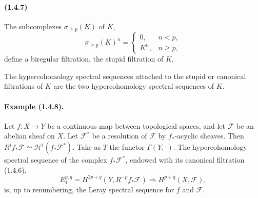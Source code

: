 \documentclass[10pt]{article}
\newcommand{\calH}{\mathcal H}
\newcommand{\calF}{\mathcal F}
\begin{document}
\paragraph{(1.4.7)} The subcomplexes $\sigma_{\ge p}(K)$ of $K$,
\[
\sigma_{\ge p}(K)^n=\begin{cases}
0,& n<p,\\
K^n,& n\ge p,
\end{cases}
\]
define a biregular filtration, the stupid filtration of $K$.

The hypercohomology spectral sequences attached to the stupid or canonical filtrations of $K$ are the two hypercohomology spectral sequences of $K$.

\paragraph{Example (1.4.8).} Let $f:X\to Y$ be a continuous map between topological spaces, and let $\calF$ be an abelian sheaf on $X$. Let $\calF^*$ be a resolution of $\calF$ by $f_*$-acyclic sheaves. Then $R^if_*\calF\simeq\calH^i(f_*\calF^*)$. Take as $T$ the functor $\Gamma(Y,\cdot)$. The hypercohomology spectral sequence of the complex $f_*\calF^*$, endowed with its canonical filtration (1.4.6),
\[
E_1^{p,q}=H^{2p+q}(Y,R^{-p}f_*\calF)\Rightarrow H^{p+q}(X,\calF),
\]
is, up to renumbering, the Leray spectral sequence for $f$ and $\calF$.
\end{document}
